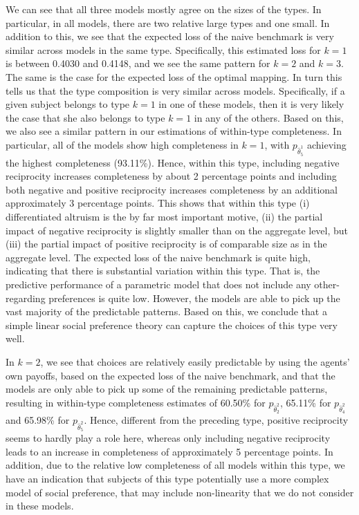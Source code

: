 \documentclass[11pt,a4paper]{article}
\theoremstyle{definition}
\begin{document}
We can see that all three models mostly agree on the sizes of the types. In particular, in all models, there are two relative large types and one small. In addition to this, we see that the expected loss of the naive benchmark is very similar across models in the same type. Specifically, this estimated loss for $k=1$ is between 0.4030 and 0.4148, and we see the same pattern for $k=2$ and $k=3$. The same is the case for the expected loss of the optimal mapping. In turn this tells us that the type composition is very similar across models. Specifically, if a given subject belongs to type $k=1$ in one of these models, then it is very likely the case that she also belongs to type $k=1$ in any of the others. Based on this, we also see a similar pattern in our estimations of within-type completeness. In particular, all of the models show high completeness in $k=1$, with $p_{\hat{\theta}_{5}^1}$ achieving the highest completeness (93.11\%). Hence, within this type, including negative reciprocity increases completeness by about 2 percentage points and including both negative and positive reciprocity increases completeness by an additional approximately 3 percentage points. This shows that within this type (i) differentiated altruism is the by far most important motive, (ii) the partial impact of negative reciprocity is slightly smaller than on the aggregate level, but (iii) the partial impact of positive reciprocity is of comparable size as in the aggregate level. The expected loss of the naive benchmark is quite high, indicating that there is substantial variation within this type. That is, the predictive performance of a parametric model that does not include any other-regarding preferences is quite low. However, the models are able to pick up the vast majority of the predictable patterns. Based on this, we conclude that a simple linear social preference theory can capture the choices of this type very well.

In $k=2$, we see that choices are relatively easily predictable by using the agents' own payoffs, based on the expected loss of the naive benchmark, and that the models are only able to pick up some of the remaining predictable patterns, resulting in within-type completeness estimates of 60.50\% for $p_{\hat{\theta}_{2}^2}$, 65.11\% for $p_{\hat{\theta}_{4}^2}$ and 65.98\% for $p_{\hat{\theta}_{5}^2}$. Hence, different from the preceding type, positive reciprocity seems to hardly play a role here, whereas only including negative reciprocity leads to an increase in completeness of approximately 5 percentage points. In addition, due to the relative low completeness of all models within this type, we have an indication that subjects of this type potentially use a more complex model of social preference, that may include non-linearity that we do not consider in these models.
\end{document}
